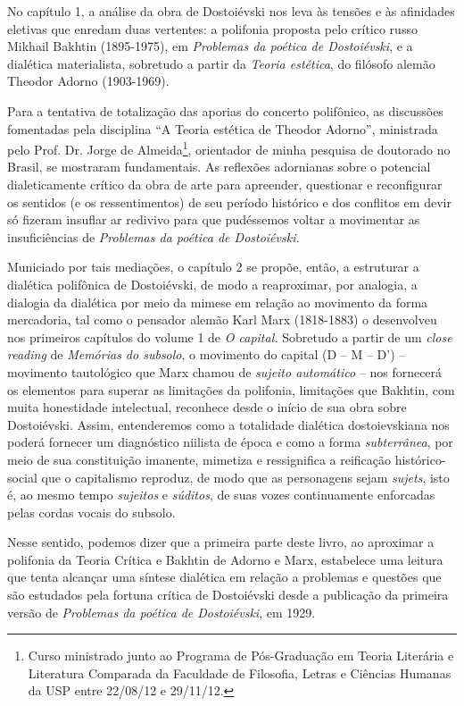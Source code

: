 No capítulo 1, a análise da obra de Dostoiévski nos leva às tensões e às
afinidades eletivas que enredam duas vertentes: a polifonia proposta
pelo crítico russo Mikhail Bakhtin (1895-1975), em \emph{Problemas da
poética de Dostoiévski}, e a dialética materialista, sobretudo a partir
da \emph{Teoria estética}, do filósofo alemão Theodor Adorno
(1903-1969).

Para a tentativa de totalização das aporias do concerto polifônico, as
discussões fomentadas pela disciplina ``A Teoria estética de Theodor
Adorno'', ministrada pelo Prof. Dr. Jorge de Almeida\footnote{Curso
  ministrado junto ao Programa de Pós-Graduação em Teoria Literária e
  Literatura Comparada da Faculdade de Filosofia, Letras e Ciências
  Humanas da USP entre 22/08/12 e 29/11/12.}, orientador de minha
pesquisa de doutorado no Brasil, se mostraram fundamentais. As reflexões
adornianas sobre o potencial dialeticamente crítico da obra de arte para
apreender, questionar e reconfigurar os sentidos (e os ressentimentos)
de seu período histórico e dos conflitos em devir só fizeram insuflar ar
redivivo para que pudéssemos voltar a movimentar as insuficiências de
\emph{Problemas da poética de Dostoiévski. }

Municiado por tais mediações, o capítulo 2 se propõe, então, a
estruturar a dialética polifônica de Dostoiévski, de modo a reaproximar,
por analogia, a dialogia da dialética por meio da mimese em relação ao
movimento da forma mercadoria, tal como o pensador alemão Karl Marx
(1818-1883) o desenvolveu nos primeiros capítulos do volume 1 de \emph{O
capital.} Sobretudo a partir de um \emph{close reading} de
\emph{Memórias do subsolo}, o movimento do capital (D -- M -- D') --
movimento tautológico que Marx chamou de \emph{sujeito automático} --
nos fornecerá os elementos para superar as limitações da polifonia,
limitações que Bakhtin, com muita honestidade intelectual, reconhece
desde o início de sua obra sobre Dostoiévski. Assim, entenderemos como a
totalidade dialética dostoievskiana nos poderá fornecer um diagnóstico
niilista de época e como a forma \emph{subterrânea}, por meio de sua
constituição imanente, mimetiza e ressignifica a reificação
histórico-social que o capitalismo reproduz, de modo que as personagens
sejam \emph{sujets}, isto é, ao mesmo tempo \emph{sujeitos} e
\emph{súditos}, de suas vozes continuamente enforcadas pelas cordas
vocais do subsolo.

Nesse sentido, podemos dizer que a primeira parte deste livro, ao
aproximar a polifonia da Teoria Crítica e Bakhtin de Adorno e Marx,
estabelece uma leitura que tenta alcançar uma síntese dialética em
relação a problemas e questões que são estudados pela fortuna crítica de
Dostoiévski desde a publicação da primeira versão de \emph{Problemas da
poética de Dostoiévski}, em 1929.

